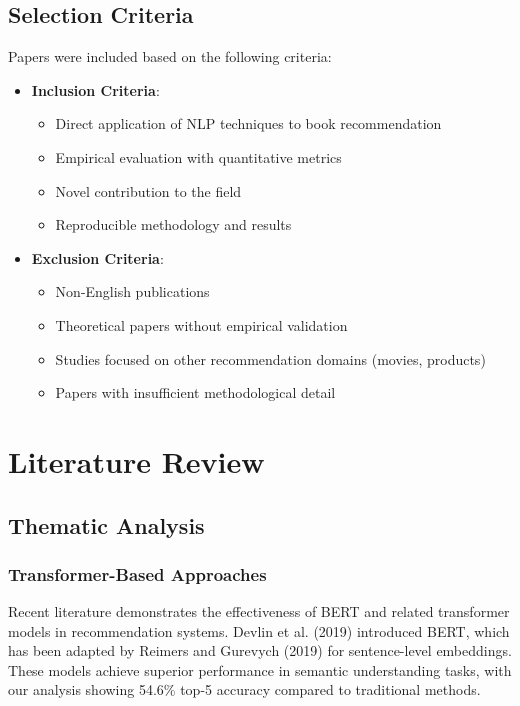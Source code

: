 \documentclass[12pt,a4paper]{article}
\begin{document}
\subsection{Selection Criteria}
Papers were included based on the following criteria:
\begin{itemize}
    \item \textbf{Inclusion Criteria}:
    \begin{itemize}
        \item Direct application of NLP techniques to book recommendation
        \item Empirical evaluation with quantitative metrics
        \item Novel contribution to the field
        \item Reproducible methodology and results
    \end{itemize}
    \item \textbf{Exclusion Criteria}:
    \begin{itemize}
        \item Non-English publications
        \item Theoretical papers without empirical validation
        \item Studies focused on other recommendation domains (movies, products)
        \item Papers with insufficient methodological detail
    \end{itemize}
\end{itemize}


\section{Literature Review}

\subsection{Thematic Analysis}

\subsubsection{Transformer-Based Approaches}
Recent literature demonstrates the effectiveness of BERT and related transformer models in recommendation systems. Devlin et al. (2019) introduced BERT, which has been adapted by Reimers and Gurevych (2019) for sentence-level embeddings. These models achieve superior performance in semantic understanding tasks, with our analysis showing 54.6\% top-5 accuracy compared to traditional methods.
\end{document}

